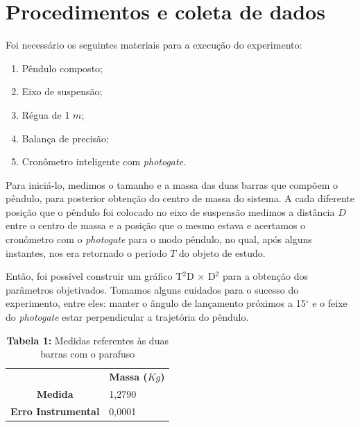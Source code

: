 \documentclass{article}
\begin{document}
\section{Procedimentos e coleta de dados}

Foi necessário os seguintes materiais para a execução do experimento:
\begin{enumerate} 
	\item Pêndulo composto; 
	\item Eixo de suspensão; 
	\item Régua de 1 $m$; 
	\item Balança de precisão;
	\item Cronômetro inteligente com \textit{photogate}.
 \end {enumerate} 

Para iniciá-lo, medimos o tamanho e a massa das duas barras que compõem o pêndulo, para posterior obtenção do centro de massa do sistema. A cada diferente posição que o pêndulo foi colocado no eixo de suspensão medimos a distância $D$ entre o centro de massa e a posição que o mesmo estava e acertamos o cronômetro com o \textit{photogate} para o modo pêndulo, no qual, após alguns instantes, nos era retornado o período $T$ do objeto de estudo.

Então, foi possível construir um gráfico T$^2$D $\times$  D$^2$ para a obtenção dos parâmetros objetivados. Tomamos alguns cuidados para o sucesso do experimento, entre eles: manter o ângulo de lançamento próximos a 15$^{\circ}$  e o feixe do \textit{photogate} estar perpendicular a trajetória do pêndulo.

\begin{table}[!ht]
	\begin{center}
		\caption*{\textbf{Tabela 1:} Medidas referentes às duas barras com o parafuso}
		\begin{tabular}{| l | l |}
			\cline{2-2} \multicolumn{0}{c|}{ } & \multicolumn{1}{c|}{\textbf{Massa ($Kg$)}} \\  \cline{1-2}
			\multicolumn{0}{|c|}{\textbf{Medida}} & 1,2790\\ \hline
			\multicolumn{0}{|c|}{\textbf{Erro Instrumental}} & 0,0001\\ \hline
		\end{tabular}
	\end{center}
\end{table}
\end{document}
